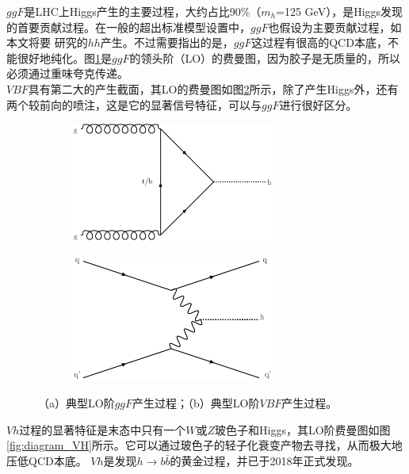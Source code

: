 $ggF$是LHC上Higgs产生的主要过程，大约占比90\%（$m_h$=125 GeV），是Higgs发现的首要贡献过程。在一般的超出标准模型设置中，$ggF$也假设为主要贡献过程，如本文将要
研究的$hh$产生。不过需要指出的是，$ggF$这过程有很高的QCD本底，不能很好地纯化。图\ref{fig:diagram_ggF}是$ggF$的领头阶（LO）的费曼图，因为胶子是无质量的，所以必须通过重味夸克传递。\\
$VBF$具有第二大的产生截面，其LO的费曼图如图\ref{fig:diagram_VBF}所示，除了产生Higgs外，还有两个较前向的喷注，这是它的显著信号特征，可以与$ggF$进行很好区分。
\begin{figure}[h]
\centering
 \begin{subfigure}[b]{0.45\textwidth}
  \includegraphics[width=0.75\textwidth]{fig/ggF.pdf}
  \caption{}
  \label{fig:diagram_ggF}
 \end{subfigure}
 \begin{subfigure}[b]{0.45\textwidth}
  \includegraphics[width=0.75\textwidth]{fig/VBF.pdf}
  \caption{}
  \label{fig:diagram_VBF}
 \end{subfigure}
\caption{（a）典型LO阶$ggF$产生过程；（b）典型LO阶$VBF$产生过程。}
\label{fig:ggF_VBF}
\end{figure}
$Vh$过程的显著特征是末态中只有一个$W$或$Z$玻色子和Higgs，其LO阶费曼图如图\ref{fig:diagram_VH}所示。它可以通过玻色子的轻子化衰变产物去寻找，从而极大地压低QCD本底。
$Vh$是发现$h\rightarrow b\bar{b}$的黄金过程，并已于2018年正式发现\cite{}。
